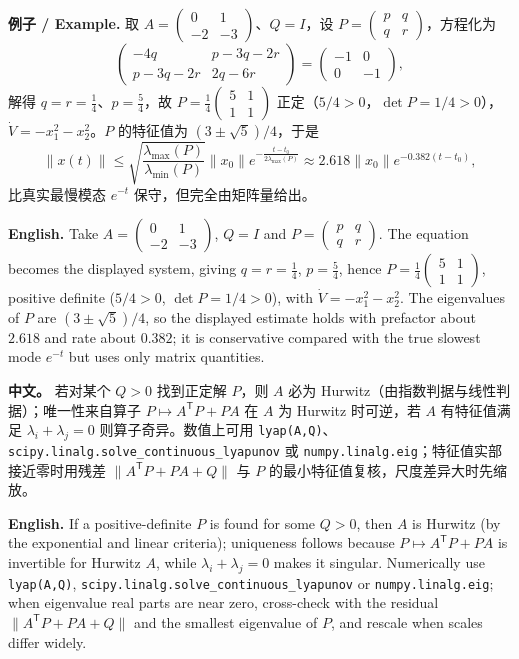 \documentclass[UTF8,11pt,a4paper]{ctexart}
\newcommand{\EN}[1]{\par\noindent\textbf{English.} #1\par}
\newcommand{\EX}[2]{\par\noindent\textbf{例子 / Example.} #1\par\EN{#2}}
\newcommand{\APS}[2]{\par\noindent\textbf{中文。} #1\par\noindent\textbf{English.} #2\par}
\newcommand{\norm}[1]{\lVert #1\rVert}\newcommand{\abs}[1]{\lvert #1\rvert}
\begin{document}
\EX{取 $A=\begin{pmatrix}0&1\\-2&-3\end{pmatrix}$、$Q=I$，设 $P=\begin{pmatrix}p&q\\q&r\end{pmatrix}$，方程化为
\[
\begin{pmatrix}-4q&p-3q-2r\\p-3q-2r&2q-6r\end{pmatrix}
=\begin{pmatrix}-1&0\\0&-1\end{pmatrix},
\]
解得 $q=r=\frac14$、$p=\frac54$，故 $P=\frac14\begin{pmatrix}5&1\\1&1\end{pmatrix}$ 正定（$5/4>0$，$\det P=1/4>0$），$\dot V=-x_1^2-x_2^2$。$P$ 的特征值为 $(3\pm\sqrt5)/4$，于是
\[
\norm{x(t)}\le\sqrt{\frac{\lambda_{\max}(P)}{\lambda_{\min}(P)}}\norm{x_0}e^{-\frac{t-t_0}{2\lambda_{\max}(P)}}
\approx2.618\norm{x_0}e^{-0.382(t-t_0)},
\]
比真实最慢模态 $e^{-t}$ 保守，但完全由矩阵量给出。}{Take $A=\begin{pmatrix}0&1\\-2&-3\end{pmatrix}$, $Q=I$ and $P=\begin{pmatrix}p&q\\q&r\end{pmatrix}$. The equation becomes the displayed system, giving $q=r=\frac14$, $p=\frac54$, hence $P=\frac14\begin{pmatrix}5&1\\1&1\end{pmatrix}$, positive definite ($5/4>0$, $\det P=1/4>0$), with $\dot V=-x_1^2-x_2^2$. The eigenvalues of $P$ are $(3\pm\sqrt5)/4$, so the displayed estimate holds with prefactor about $2.618$ and rate about $0.382$; it is conservative compared with the true slowest mode $e^{-t}$ but uses only matrix quantities.}

\APS{若对某个 $Q>0$ 找到正定解 $P$，则 $A$ 必为 Hurwitz（由指数判据与线性判据）；唯一性来自算子 $P\mapsto A^{\mathsf T}P+PA$ 在 $A$ 为 Hurwitz 时可逆，若 $A$ 有特征值满足 $\lambda_i+\lambda_j=0$ 则算子奇异。数值上可用 \texttt{lyap(A,Q)}、\texttt{scipy.linalg.solve\_continuous\_lyapunov} 或 \texttt{numpy.linalg.eig}；特征值实部接近零时用残差 $\norm{A^{\mathsf T}P+PA+Q}$ 与 $P$ 的最小特征值复核，尺度差异大时先缩放。}{If a positive-definite $P$ is found for some $Q>0$, then $A$ is Hurwitz (by the exponential and linear criteria); uniqueness follows because $P\mapsto A^{\mathsf T}P+PA$ is invertible for Hurwitz $A$, while $\lambda_i+\lambda_j=0$ makes it singular. Numerically use \texttt{lyap(A,Q)}, \texttt{scipy.linalg.solve\_continuous\_lyapunov} or \texttt{numpy.linalg.eig}; when eigenvalue real parts are near zero, cross-check with the residual $\norm{A^{\mathsf T}P+PA+Q}$ and the smallest eigenvalue of $P$, and rescale when scales differ widely.}
\end{document}
